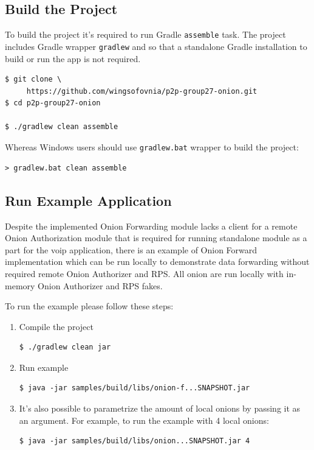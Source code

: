 \documentclass{article}
\begin{document}
\subsection{Build the Project}
To build the project it's required to run Gradle \verb|assemble| task. The project includes Gradle wrapper \verb|gradlew| and so that a standalone Gradle installation to build or run the app is not required.
\begin{lstlisting}
$ git clone \ 
     https://github.com/wingsofovnia/p2p-group27-onion.git
$ cd p2p-group27-onion

$ ./gradlew clean assemble
\end{lstlisting}

Whereas Windows users should use \verb|gradlew.bat| wrapper to build the project:
\begin{lstlisting}
> gradlew.bat clean assemble
\end{lstlisting}

\subsection{Run Example Application}
Despite the implemented Onion Forwarding module lacks a client for a remote Onion Authorization module that is required for running standalone module as a part for the voip application, there is an example of Onion Forward implementation which can be run locally to demonstrate data forwarding without required remote Onion Authorizer and RPS. All onion are run locally with in-memory Onion Authorizer and RPS fakes.

To run the example please follow these steps:
\begin{enumerate}
  \item Compile the project
    \begin{lstlisting}
$ ./gradlew clean jar
    \end{lstlisting}
  \item Run example
  \begin{lstlisting}
$ java -jar samples/build/libs/onion-f...SNAPSHOT.jar
    \end{lstlisting}
  \item It's also possible to parametrize the amount of local onions by passing it as an argument. For example, to run the example with 4 local onions:
  \begin{lstlisting}
$ java -jar samples/build/libs/onion...SNAPSHOT.jar 4
    \end{lstlisting}
\end{enumerate}
\end{document}
